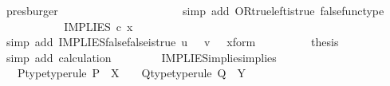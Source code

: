 \begin{isabellebody}
\ presburger\isanewline
\ \ \ \ \ \ \isamarkupfalse%
\ \isamarkupfalse%
\ {\isachardoublequoteopen}{\isachardot}{\kern0pt}{\isachardot}{\kern0pt}{\isachardot}{\kern0pt}\ {\isacharequal}{\kern0pt}\ {\isasymt}{\isachardoublequoteclose}\isanewline
\ \ \ \ \ \ \ \ \isamarkupfalse%
\ {\isacharparenleft}{\kern0pt}simp\ add{\isacharcolon}{\kern0pt}\ OR{\isacharunderscore}{\kern0pt}true{\isacharunderscore}{\kern0pt}left{\isacharunderscore}{\kern0pt}is{\isacharunderscore}{\kern0pt}true\ false{\isacharunderscore}{\kern0pt}func{\isacharunderscore}{\kern0pt}type{\isacharparenright}{\kern0pt}\isanewline
\ \ \ \ \ \ \isamarkupfalse%
\ \isamarkupfalse%
\ {\isachardoublequoteopen}{\isachardot}{\kern0pt}{\isachardot}{\kern0pt}{\isachardot}{\kern0pt}\ {\isacharequal}{\kern0pt}\ IMPLIES\ {\isasymcirc}\isactrlsub c\ x{\isachardoublequoteclose}\isanewline
\ \ \ \ \ \ \ \ \isamarkupfalse%
\ {\isacharparenleft}{\kern0pt}simp\ add{\isacharcolon}{\kern0pt}\ IMPLIES{\isacharunderscore}{\kern0pt}false{\isacharunderscore}{\kern0pt}false{\isacharunderscore}{\kern0pt}is{\isacharunderscore}{\kern0pt}true\ {\isacartoucheopen}u\ {\isacharequal}{\kern0pt}\ {\isasymf}{\isacartoucheclose}\ {\isacartoucheopen}v\ {\isacharequal}{\kern0pt}\ {\isasymf}{\isacartoucheclose}\ x{\isacharunderscore}{\kern0pt}form{\isacharparenright}{\kern0pt}\isanewline
\ \ \ \ \ \ \isamarkupfalse%
\ \isamarkupfalse%
\ {\isacharquery}{\kern0pt}thesis\isanewline
\ \ \ \ \ \ \ \ \isamarkupfalse%
\ {\isacharparenleft}{\kern0pt}simp\ add{\isacharcolon}{\kern0pt}\ calculation{\isacharparenright}{\kern0pt}\isanewline
\ \ \ \ \isamarkupfalse%
\isanewline
\ \ \isamarkupfalse%
\isanewline
{}\isamarkupfalse%
%
\endisatagproof
{\isafoldproof}%
%
\isadelimproof
\isanewline
%
\endisadelimproof
\isanewline
{}\isamarkupfalse%
\ IMPLIES{\isacharunderscore}{\kern0pt}implies{\isacharunderscore}{\kern0pt}implies{\isacharcolon}{\kern0pt}\isanewline
\ \ \ P{\isacharunderscore}{\kern0pt}type{\isacharbrackleft}{\kern0pt}type{\isacharunderscore}{\kern0pt}rule{\isacharbrackright}{\kern0pt}{\isacharcolon}{\kern0pt}\ {\isachardoublequoteopen}P\ {\isacharcolon}{\kern0pt}\ X\ {\isasymrightarrow}\ {\isasymOmega}{\isachardoublequoteclose}\ \ Q{\isacharunderscore}{\kern0pt}type{\isacharbrackleft}{\kern0pt}type{\isacharunderscore}{\kern0pt}rule{\isacharbrackright}{\kern0pt}{\isacharcolon}{\kern0pt}\ {\isachardoublequoteopen}Q\ {\isacharcolon}{\kern0pt}\ Y\ {\isasymrightarrow}\ {\isasymOmega}{\isachardoublequoteclose}\isanewline

\end{isabellebody}
